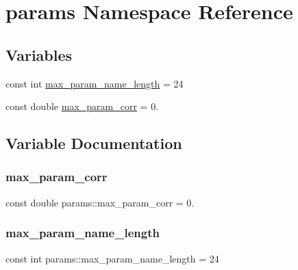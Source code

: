 \hypertarget{namespaceparams}{}\section{params Namespace Reference}
\label{namespaceparams}
\subsection*{Variables}
\begin{DoxyCompactItemize}
\item 
const int \mbox{\hyperlink{namespaceparams_ab3e1340597bd84fd5ab6073c64de9cd1}{max\+\_\+param\+\_\+name\+\_\+length}} = 24
\item 
const double \mbox{\hyperlink{namespaceparams_a2a3f7e9e4567872b90211f63ca913c7b}{max\+\_\+param\+\_\+corr}} = 0.
\end{DoxyCompactItemize}


\subsection{Variable Documentation}
\mbox{\label{namespaceparams_a2a3f7e9e4567872b90211f63ca913c7b}} 
\subsubsection{\texorpdfstring{max\_param\_corr}{max\_param\_corr}}
{\footnotesize\ttfamily const double params\+::max\+\_\+param\+\_\+corr = 0.}

\mbox{\label{namespaceparams_ab3e1340597bd84fd5ab6073c64de9cd1}} 
\subsubsection{\texorpdfstring{max\_param\_name\_length}{max\_param\_name\_length}}
{\footnotesize\ttfamily const int params\+::max\+\_\+param\+\_\+name\+\_\+length = 24}

